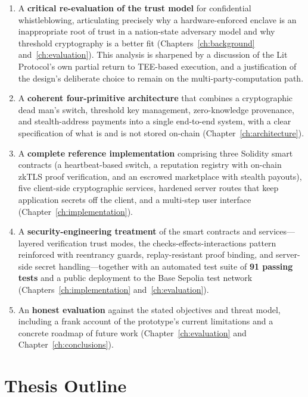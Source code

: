 \begin{enumerate}
  \item A \textbf{critical re-evaluation of the trust model} for confidential
  whistleblowing, articulating precisely why a hardware-enforced enclave is an
  inappropriate root of trust in a nation-state adversary model and why threshold
  cryptography is a better fit (Chapters~\ref{ch:background}
  and~\ref{ch:evaluation}). This analysis is sharpened by a discussion of the Lit
  Protocol's own partial return to TEE-based execution, and a justification of
  the design's deliberate choice to remain on the multi-party-computation path.

  \item A \textbf{coherent four-primitive architecture} that combines a
  cryptographic dead man's switch, threshold key management, zero-knowledge
  provenance, and stealth-address payments into a single end-to-end system, with
  a clear specification of what is and is not stored on-chain
  (Chapter~\ref{ch:architecture}).

  \item A \textbf{complete reference implementation} comprising three Solidity
  smart contracts (a heartbeat-based switch, a reputation registry with on-chain
  zkTLS proof verification, and an escrowed marketplace with stealth payouts),
  five client-side cryptographic services, hardened server routes that keep
  application secrets off the client, and a multi-step user interface
  (Chapter~\ref{ch:implementation}).

  \item A \textbf{security-engineering treatment} of the smart contracts and
  services---layered verification trust modes, the checks-effects-interactions
  pattern reinforced with reentrancy guards, replay-resistant proof binding, and
  server-side secret handling---together with an automated test suite of
  \textbf{91 passing tests} and a public deployment to the Base Sepolia test
  network (Chapters~\ref{ch:implementation} and~\ref{ch:evaluation}).

  \item An \textbf{honest evaluation} against the stated objectives and threat
  model, including a frank account of the prototype's current limitations and a
  concrete roadmap of future work (Chapter~\ref{ch:evaluation} and
  Chapter~\ref{ch:conclusions}).
\end{enumerate}

\section{Thesis Outline}
\label{sec:intro-outline}

